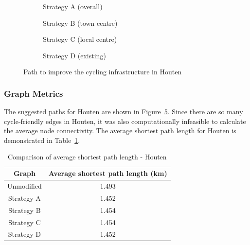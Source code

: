 \documentclass[12pt,a4paper]{report}
\begin{document}
\begin{figure}[ht]
    \centering
    \begin{subfigure}[ht]{0.47\textwidth}
        \centering
        
        \caption{Strategy A (overall)}
        \label{fig:overall houten}
    \end{subfigure}
    \hfill
    \begin{subfigure}[ht]{0.47\textwidth}
        \centering
        
        \caption{Strategy B (town centre)}
        \label{fig:centre houten}
    \end{subfigure}
    \hfill
    \begin{subfigure}[ht]{0.47\textwidth}
        \centering
        
        \caption{Strategy C (local centre)}
        \label{fig:local houten}
    \end{subfigure}
    \hfill
    \begin{subfigure}[ht]{0.47\textwidth}
        \centering
        
        \caption{Strategy D (existing)}
        \label{fig:existing houten}
    \end{subfigure}
       \caption{Path to improve the cycling infrastructure in Houten}
       \label{fig:path houten}
\end{figure}

\subsubsection*{Graph Metrics}
The suggested paths for Houten are shown in Figure~\ref{fig:path houten}. Since there are so many cycle-friendly edges in Houten, it was also computationally infeasible to calculate the average node connectivity. The average shortest path length for Houten is demonstrated in Table~\ref{tab:avg houten}.

\begin{table}[ht!]
    \centering
    \begin{tabular}{|c|c|}
        \hline
        Graph & Average shortest path length (km) \\
        \hline
        Unmodified & 1.493 \\
        Strategy A & 1.452 \\
        Strategy B & 1.454 \\
        Strategy C & 1.454 \\
        Strategy D & 1.452 \\
        \hline
    \end{tabular}
    \caption{Comparison of average shortest path length - Houten}
    \label{tab:avg houten}
\end{table}
\end{document}
